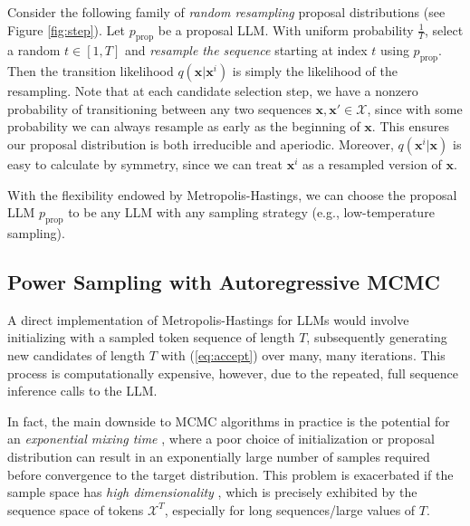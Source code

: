 \documentclass{article}
\newcommand{\yilun}[1]{{\color{red} [yilun: #1]}}
\begin{document}
Consider the following family of \textit{random resampling} proposal distributions (see Figure \ref{fig:step}). Let $p_{\text{prop}}$ be a proposal LLM. With uniform probability $\frac{1}{T}$, select a random $t \in [1, T]$ and \textit{resample the sequence}  starting at index $t$ using $p_{\text{prop}}$. Then the transition likelihood $q(\mathbf{x} | \mathbf{x}^i)$ is simply the likelihood of the resampling. Note that at each candidate selection step, we have a nonzero probability of transitioning between any two sequences $\mathbf{x}, \mathbf{x'} \in \mathcal{X}$, since with some probability we can always resample as early as the beginning of $\mathbf{x}$. This ensures our proposal distribution is both irreducible and aperiodic. Moreover, $q(\mathbf{x}^i | \mathbf{x})$ is easy to calculate by symmetry, since we can treat $\mathbf{x}^i$ as a resampled version of $\mathbf{x}$.

With the flexibility endowed by Metropolis-Hastings, we can choose the proposal LLM $p_{\text{prop}}$ to be any LLM with any sampling strategy (e.g., low-temperature sampling). 


\subsection{Power Sampling with Autoregressive MCMC}\label{subsec:samp}



A direct implementation of Metropolis-Hastings for LLMs would involve initializing with a sampled token sequence of length $T$, subsequently generating new candidates of length $T$ with (\ref{eq:accept}) over many, many iterations. This process  is computationally expensive, however, due to the repeated, full sequence inference calls to the LLM.

In fact, the main downside to MCMC algorithms in practice is the potential for an \textit{exponential mixing time} \citep{gheissari2017exponentially}, where a poor choice of initialization or proposal distribution can result in an exponentially large number of samples required before convergence to the target distribution. This problem is exacerbated if the sample space has \textit{high dimensionality} \citep{bandeira2022freeenergybarriers,schmidlerwoodard2013lowerbounds}, which is precisely exhibited by the sequence space of tokens $\mathcal{X}^T$, especially for long sequences/large values of $T$. 
\end{document}
